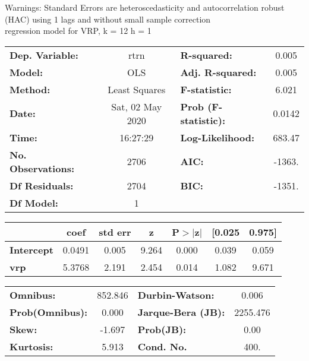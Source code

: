 Warnings: \newline
 [1] Standard Errors are heteroscedasticity and autocorrelation robust (HAC) using 1 lags and without small sample correction\\ 

regression model for VRP, k = 12 h = 1\begin{center}
\begin{tabular}{lclc}
\toprule
\textbf{Dep. Variable:}    &       rtrn       & \textbf{  R-squared:         } &     0.005   \\
\textbf{Model:}            &       OLS        & \textbf{  Adj. R-squared:    } &     0.005   \\
\textbf{Method:}           &  Least Squares   & \textbf{  F-statistic:       } &     6.021   \\
\textbf{Date:}             & Sat, 02 May 2020 & \textbf{  Prob (F-statistic):} &   0.0142    \\
\textbf{Time:}             &     16:27:29     & \textbf{  Log-Likelihood:    } &    683.47   \\
\textbf{No. Observations:} &        2706      & \textbf{  AIC:               } &    -1363.   \\
\textbf{Df Residuals:}     &        2704      & \textbf{  BIC:               } &    -1351.   \\
\textbf{Df Model:}         &           1      & \textbf{                     } &             \\
\bottomrule
\end{tabular}
\begin{tabular}{lcccccc}
                   & \textbf{coef} & \textbf{std err} & \textbf{z} & \textbf{P$> |$z$|$} & \textbf{[0.025} & \textbf{0.975]}  \\
\midrule
\textbf{Intercept} &       0.0491  &        0.005     &     9.264  &         0.000        &        0.039    &        0.059     \\
\textbf{vrp}       &       5.3768  &        2.191     &     2.454  &         0.014        &        1.082    &        9.671     \\
\bottomrule
\end{tabular}
\begin{tabular}{lclc}
\textbf{Omnibus:}       & 852.846 & \textbf{  Durbin-Watson:     } &    0.006  \\
\textbf{Prob(Omnibus):} &   0.000 & \textbf{  Jarque-Bera (JB):  } & 2255.476  \\
\textbf{Skew:}          &  -1.697 & \textbf{  Prob(JB):          } &     0.00  \\
\textbf{Kurtosis:}      &   5.913 & \textbf{  Cond. No.          } &     400.  \\
\bottomrule
\end{tabular}
\end{center}

